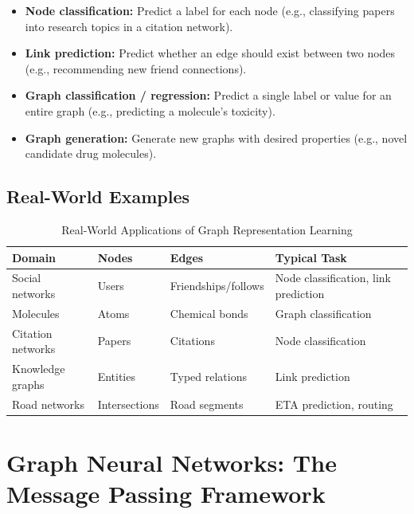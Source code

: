 \documentclass[12pt,a4paper]{article}
\begin{document}
\begin{itemize}
    \item \textbf{Node classification:} Predict a label for each node (e.g., classifying papers into research topics in a citation network).
    \item \textbf{Link prediction:} Predict whether an edge should exist between two nodes (e.g., recommending new friend connections).
    \item \textbf{Graph classification / regression:} Predict a single label or value for an entire graph (e.g., predicting a molecule's toxicity).
    \item \textbf{Graph generation:} Generate new graphs with desired properties (e.g., novel candidate drug molecules).
\end{itemize}

\subsection{Real-World Examples}

\begin{table}[h!]
\centering
\renewcommand{\arraystretch}{1.3}
\begin{tabular}{|l|l|l|l|}
\hline
\textbf{Domain} & \textbf{Nodes} & \textbf{Edges} & \textbf{Typical Task} \\
\hline
Social networks & Users & Friendships/follows & Node classification, link prediction \\
Molecules & Atoms & Chemical bonds & Graph classification \\
Citation networks & Papers & Citations & Node classification \\
Knowledge graphs & Entities & Typed relations & Link prediction \\
Road networks & Intersections & Road segments & ETA prediction, routing \\
\hline
\end{tabular}
\caption{Real-World Applications of Graph Representation Learning}
\end{table}

\vspace{0.5cm}

\section{Graph Neural Networks: The Message Passing Framework}
\end{document}

